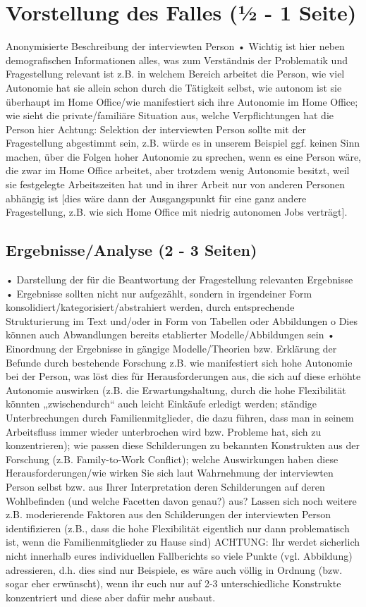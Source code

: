 \documentclass[man]{apa7}
\begin{document}
\section{Vorstellung des Falles (1⁄2 - 1 Seite)}
 Anonymisierte Beschreibung der interviewten Person
• Wichtig ist hier neben demografischen Informationen alles, was zum Verständnis der Problematik und Fragestellung relevant ist
z.B. in welchem Bereich arbeitet die Person, wie viel Autonomie hat sie allein schon durch die Tätigkeit selbst, wie autonom ist sie überhaupt im Home Office/wie manifestiert sich ihre Autonomie im Home Office; wie sieht die private/familiäre Situation aus, welche Verpflichtungen hat die Person hier
Achtung: Selektion der interviewten Person sollte mit der Fragestellung abgestimmt sein, z.B. würde es in unserem Beispiel ggf. keinen Sinn machen, über die Folgen hoher Autonomie zu sprechen, wenn es eine Person wäre, die zwar im Home Office arbeitet, aber trotzdem wenig Autonomie besitzt, weil sie festgelegte Arbeitszeiten hat und in ihrer Arbeit nur von anderen Personen abhängig ist [dies wäre dann der Ausgangspunkt für eine ganz andere Fragestellung, z.B. wie sich Home Office mit niedrig autonomen Jobs verträgt].

\subsection{Ergebnisse/Analyse (2 - 3 Seiten)}
• Darstellung der für die Beantwortung der Fragestellung relevanten Ergebnisse
• Ergebnisse sollten nicht nur aufgezählt, sondern in irgendeiner Form
konsolidiert/kategorisiert/abstrahiert werden, durch entsprechende Strukturierung im Text und/oder in Form von Tabellen oder Abbildungen
o Dies können auch Abwandlungen bereits etablierter Modelle/Abbildungen sein
• Einordnung der Ergebnisse in gängige Modelle/Theorien bzw. Erklärung der Befunde durch
bestehende Forschung
z.B. wie manifestiert sich hohe Autonomie bei der Person, was löst dies für Herausforderungen aus, die sich auf diese erhöhte Autonomie auswirken (z.B. die Erwartungshaltung, durch die hohe Flexibilität könnten „zwischendurch“ auch leicht Einkäufe erledigt werden; ständige Unterbrechungen durch Familienmitglieder, die dazu führen, dass man in seinem Arbeitsfluss immer wieder unterbrochen wird bzw. Probleme hat, sich zu konzentrieren); wie passen diese Schilderungen zu bekannten Konstrukten aus der Forschung (z.B. Family-to-Work Conflict); welche Auswirkungen haben diese Herausforderungen/wie wirken Sie sich laut Wahrnehmung der interviewten Person selbst bzw. aus Ihrer Interpretation deren Schilderungen auf deren Wohlbefinden (und welche Facetten davon genau?) aus? Lassen sich noch weitere z.B. moderierende Faktoren aus den Schilderungen der interviewten Person identifizieren (z.B., dass die hohe Flexibilität eigentlich nur dann problematisch ist, wenn die Familienmitglieder zu Hause sind)
ACHTUNG: Ihr werdet sicherlich nicht innerhalb eures individuellen Fallberichts so viele Punkte (vgl. Abbildung) adressieren, d.h. dies sind nur Beispiele, es wäre auch völlig in Ordnung (bzw. sogar eher erwünscht), wenn ihr euch nur auf 2-3 unterschiedliche Konstrukte konzentriert und diese aber dafür mehr ausbaut.
\end{document}
